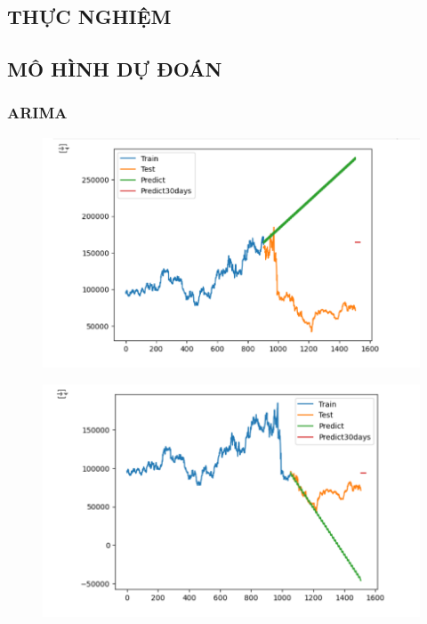 \documentclass{article}
\begin{document}
\begin{multicols}{2}
\section{THỰC NGHIỆM}

\subsection{MÔ HÌNH DỰ ĐOÁN }
\subsubsection{ARIMA}
\begin{figure}[H]
    \centering
    \begin{minipage}{0.15\textwidth}
    \centering
    \includegraphics[width=1\textwidth]{Image/ARIMA/30_6_4_LG_Arima.png}
   
    \label{fig:1}
    \end{minipage}%
    \begin{minipage}{0.15\textwidth}
    \centering
    \includegraphics[width=1\textwidth]{Image/ARIMA/30_7_3_LG_Arima.png}
  

\end{minipage}
\end{figure}
\end{multicols}
\end{document}
